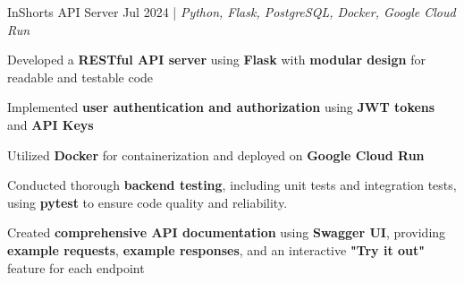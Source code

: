 \resumeSubheadings
{InShorts API Server  \space {}}{Jul 2024}
{}{}{| \textit{Python, Flask, PostgreSQL, Docker, Google Cloud Run}}
\resumeItemListStart
\item Developed a \textbf{RESTful API server} using \textbf{Flask} with \textbf{modular design} for readable and testable code
\item Implemented \textbf{user authentication and authorization} using \textbf{JWT tokens} and \textbf{API Keys}
\item Utilized \textbf{Docker} for containerization and deployed on \textbf{Google Cloud Run}
\item Conducted thorough \textbf{backend testing}, including unit tests and integration tests, using \textbf{pytest} to ensure code quality and reliability.
\item Created \textbf{comprehensive API documentation} using \textbf{Swagger UI}, providing \textbf{example requests}, \textbf{example responses}, and an interactive \textbf{"Try it out"} feature for each endpoint
\resumeItemListEnd